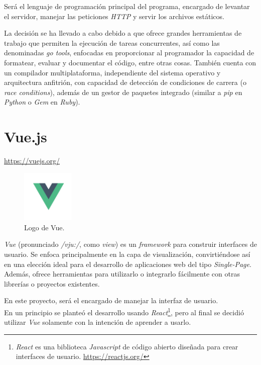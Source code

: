 Será el lenguaje de programación principal del programa, encargado de levantar el servidor, manejar las peticiones \textit{HTTP} y servir los archivos estáticos.\sn

La decisión se ha llevado a cabo debido a que ofrece grandes herramientas de trabajo que permiten la ejecución de tareas concurrentes, así como las denominadas \textit{go tools}, enfocadas en proporcionar al programador la capacidad de formatear, evaluar y documentar el código, entre otras cosas. También cuenta con un compilador multiplataforma, independiente del sistema operativo y arquitectura anfitrión, con capacidad de detección de condiciones de carrera (o \textit{race conditions}), además de un gestor de paquetes integrado (similar a \textit{pip} en \textit{Python} o \textit{Gem} en \textit{Ruby}).\n

\newpage


\section{Vue.js} \label{sec:vue}

\footnotesize\color{gray}
\url{https://vuejs.org/}
\normalsize\color{black}\sn

\begin{figure}
\includegraphics[width=2.5cm]{img/tables/13_Vue.png}
\caption{Logo de Vue.}
\label{fig:vue}
\end{figure}

\textit{Vue} (pronunciado \textit{/vju:/}, como \textit{view}) es un \textit{framework} para construir interfaces de usuario. Se enfoca principalmente en la capa de visualización, convirtiéndose así en una elección ideal para el desarrollo de aplicaciones web del tipo \textit{Single-Page}. Además, ofrece herramientas para utilizarlo o integrarlo fácilmente con otras librerías o proyectos existentes.\sn

En este proyecto, será el encargado de manejar la interfaz de usuario.\\
En un principio se planteó el desarrollo usando \textit{React}\footnote{\textit{React} es una biblioteca \textit{Javascript} de código abierto diseñada para crear interfaces de usuario. \url{https://reactjs.org/}}, pero al final se decidió utilizar \textit{Vue} solamente con la intención de aprender a usarlo.\sn

